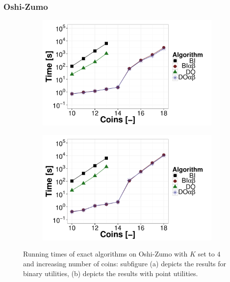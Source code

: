 \subsubsection{Oshi-Zumo}
\begin{figure}[t!]
\centering
	\begin{subfigure}{0.49\textwidth}
		\includegraphics[width=1\textwidth]{figures/OZ-K4.pdf}\caption{}\label{fig:off:res:oz4}
	\end{subfigure}
	\begin{subfigure}{0.49\textwidth}
		\includegraphics[width=1\textwidth]{figures/OZ-K4-BF.pdf}\caption{}\label{fig:off:res:oz4-bf}
	\end{subfigure}
\caption{Running times of exact algorithms on Oshi-Zumo with $K$ set to $4$ and increasing number of coins: subfigure (a) depicts the results for binary utilities, (b) depicts the results with point utilities.} \label{fig:off:res:oz}
\end{figure}

